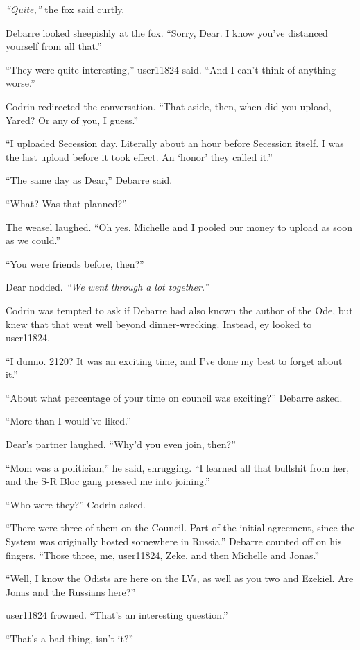\emph{``Quite,''} the fox said curtly.

Debarre looked sheepishly at the fox. ``Sorry, Dear. I know you've distanced yourself from all that.''

``They were quite interesting,'' user11824 said. ``And I can't think of anything worse.''

Codrin redirected the conversation. ``That aside, then, when did you upload, Yared? Or any of you, I guess.''

``I uploaded Secession day. Literally about an hour before Secession itself. I was the last upload before it took effect. An `honor' they called it.''

``The same day as Dear,'' Debarre said.

``What? Was that planned?''

The weasel laughed. ``Oh yes. Michelle and I pooled our money to upload as soon as we could.''

``You were friends before, then?''

Dear nodded. \emph{``We went through a lot together.''}

Codrin was tempted to ask if Debarre had also known the author of the Ode, but knew that that went well beyond dinner-wrecking. Instead, ey looked to user11824.

``I dunno. 2120? It was an exciting time, and I've done my best to forget about it.''

``About what percentage of your time on council was exciting?'' Debarre asked.

``More than I would've liked.''

Dear's partner laughed. ``Why'd you even join, then?''

``Mom was a politician,'' he said, shrugging. ``I learned all that bullshit from her, and the S-R Bloc gang pressed me into joining.''

``Who were they?'' Codrin asked.

``There were three of them on the Council. Part of the initial agreement, since the System was originally hosted somewhere in Russia.'' Debarre counted off on his fingers. ``Those three, me, user11824, Zeke, and then Michelle and Jonas.''

``Well, I know the Odists are here on the LVs, as well as you two and Ezekiel. Are Jonas and the Russians here?''

user11824 frowned. ``That's an interesting question.''

``That's a bad thing, isn't it?''

